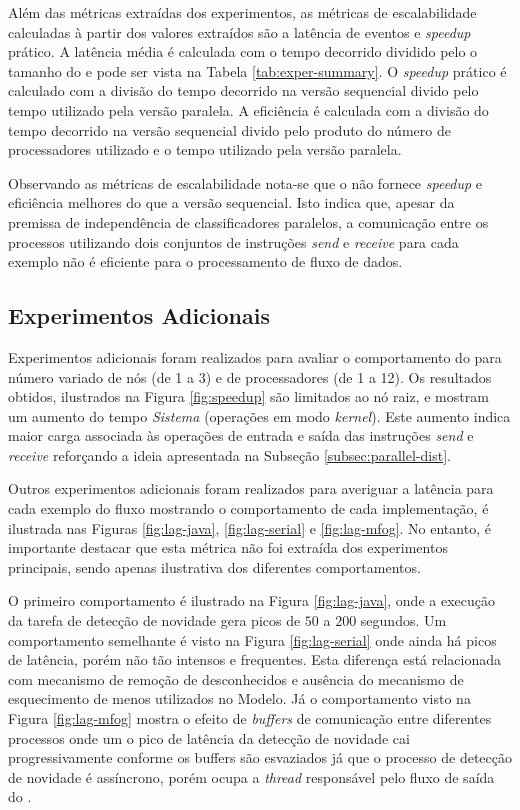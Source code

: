 Além das métricas extraídas dos experimentos, as métricas de escalabilidade
calculadas à partir dos valores extraídos são a latência de eventos e
\emph{speedup} prático.
A latência média é calculada com o tempo decorrido dividido pelo o tamanho do
\dataset e pode ser vista na Tabela \ref{tab:exper-summary}.
O \emph{speedup} prático é calculado com a divisão do tempo decorrido na versão
sequencial divido pelo tempo utilizado pela versão paralela.
A eficiência é calculada com a divisão do tempo decorrido na versão sequencial
divido pelo produto do número de processadores utilizado e o tempo utilizado
pela versão paralela.

Observando as métricas de escalabilidade nota-se que o \mfog não fornece
\emph{speedup} e eficiência melhores do que a versão sequencial.
Isto indica que, apesar da premissa de independência de classificadores
paralelos, a comunicação entre os processos utilizando dois conjuntos de
instruções \mpi \emph{send} e \emph{receive} para cada exemplo não é eficiente
para o processamento de fluxo de dados.

\subsection{Experimentos Adicionais}

Experimentos adicionais foram realizados para avaliar o comportamento do \mfog
para número variado de nós (de 1 a 3) e de processadores (de 1 a 12).
Os resultados obtidos, ilustrados na Figura \ref{fig:speedup} são limitados ao
nó raiz, e mostram um aumento do tempo \emph{Sistema} (operações em modo
\emph{kernel}).
Este aumento indica maior carga associada às operações de entrada e saída das
instruções \emph{send} e \emph{receive} reforçando a ideia apresentada na
Subseção \ref{subsec:parallel-dist}.

Outros experimentos adicionais foram realizados para averiguar a latência para
cada exemplo do fluxo mostrando o comportamento de cada implementação, é
ilustrada nas Figuras \ref{fig:lag-java}, \ref{fig:lag-serial} e
\ref{fig:lag-mfog}.
No entanto, é importante destacar que esta métrica não foi extraída dos
experimentos principais, sendo apenas ilustrativa dos diferentes comportamentos.

O primeiro comportamento é ilustrado na Figura \ref{fig:lag-java}, onde a execução
da tarefa de detecção de novidade gera picos de $50$ a $200$ segundos.
Um comportamento semelhante é visto na Figura \ref{fig:lag-serial} onde ainda há
picos de latência, porém não tão intensos e frequentes.
Esta diferença está relacionada com mecanismo de remoção de desconhecidos e
ausência do mecanismo de esquecimento de \mclusters menos utilizados no Modelo.
Já o comportamento visto na Figura \ref{fig:lag-mfog} mostra o efeito de
\emph{buffers} de comunicação entre diferentes processos onde um o pico de latência
da detecção de novidade cai progressivamente conforme os buffers são esvaziados
já que o processo de detecção de novidade é assíncrono, porém ocupa a \emph{thread}
responsável pelo fluxo de saída do \mfog.

